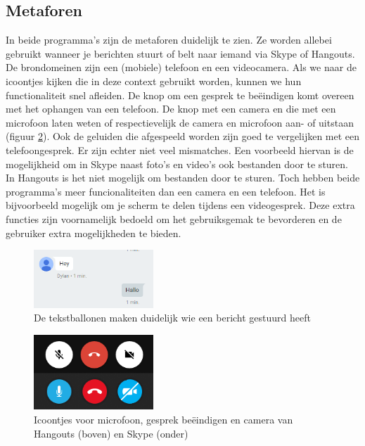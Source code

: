 \documentclass[11pt]{article}
\begin{document}
\subsection{Metaforen}
In beide programma's zijn de metaforen duidelijk te zien. Ze worden allebei gebruikt wanneer je berichten stuurt of belt naar iemand via Skype of Hangouts. De brondomeinen zijn een (mobiele) telefoon en een videocamera. Als we naar de icoontjes kijken die in deze context gebruikt worden, kunnen we hun functionaliteit snel afleiden. De knop om een gesprek te be\"eindigen  komt overeen met het ophangen van een telefoon. De knop met een camera en die met een microfoon laten weten of respectievelijk de camera en microfoon aan- of uitstaan (figuur \ref{fig:SHMetafoor}). Ook de geluiden die afgespeeld worden zijn goed te vergelijken met een telefoongesprek. Er zijn echter niet veel mismatches. Een voorbeeld hiervan is de mogelijkheid om in Skype naast foto's en video's ook bestanden door te sturen. In Hangouts is het niet mogelijk om bestanden door te sturen. Toch hebben beide programma's meer funcionaliteiten dan een camera en een telefoon. Het is bijvoorbeeld mogelijk om je scherm te delen tijdens een videogesprek. Deze extra functies zijn voornamelijk bedoeld om het gebruiksgemak te bevorderen en de gebruiker extra mogelijkheden te bieden.
\begin{figure}
	\centering
	\includegraphics[width=0.4\textwidth]{Dylan_HChat.png}
	\caption{De tekstballonen maken duidelijk wie een bericht gestuurd heeft}
	\label{fig:HChat}
\end{figure}
\begin{figure}
	\centering
	\includegraphics[width=0.4\textwidth]{Dylan_SHMetafoor.png}
	\caption{Icoontjes voor microfoon, gesprek be\"eindigen en camera van Hangouts (boven) en Skype (onder)}
	\label{fig:SHMetafoor}
\end{figure}
\newpage
\end{document}
